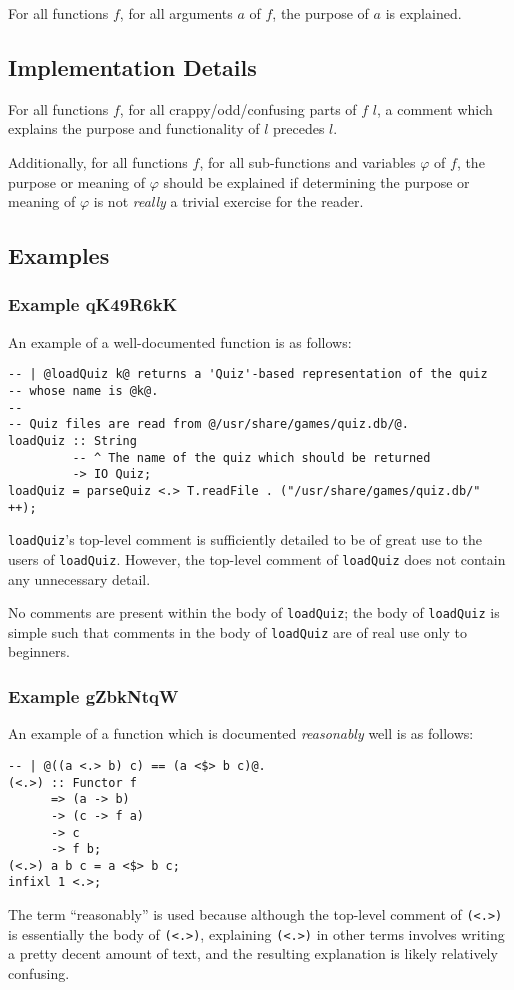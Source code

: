 \documentclass{report}
\begin{document}
For all functions $f$, for all arguments $a$ of $f$, the purpose of $a$ is explained.
\subsection{Implementation Details}
For all functions $f$, for all crappy/odd/confusing parts of $f$ $l$, a comment which explains the purpose and functionality of $l$ precedes $l$.

Additionally, for all functions $f$, for all sub-functions and variables $\varphi$ of $f$, the purpose or meaning of $\varphi$ should be explained if determining the purpose or meaning of $\varphi$ is not \textit{really} a trivial exercise for the reader.
\subsection{Examples}
\subsubsection{Example qK49R6kK}
An example of a well-documented function is as follows:
\lstset{style=customhaskell}
\begin{lstlisting}
-- | @loadQuiz k@ returns a 'Quiz'-based representation of the quiz
-- whose name is @k@.
--
-- Quiz files are read from @/usr/share/games/quiz.db/@.
loadQuiz :: String
         -- ^ The name of the quiz which should be returned
         -> IO Quiz;
loadQuiz = parseQuiz <.> T.readFile . ("/usr/share/games/quiz.db/" ++);
\end{lstlisting}
\texttt{loadQuiz}'s top-level comment is sufficiently detailed to be of great use to the users of \texttt{loadQuiz}.  However, the top-level comment of \texttt{loadQuiz} does not contain any unnecessary detail.

No comments are present within the body of \texttt{loadQuiz}; the body of \texttt{loadQuiz} is simple such that comments in the body of \texttt{loadQuiz} are of real use only to beginners.
\subsubsection{Example gZbkNtqW}
An example of a function which is documented \textit{reasonably} well is as follows:
\begin{lstlisting}
-- | @((a <.> b) c) == (a <$> b c)@.
(<.>) :: Functor f
      => (a -> b)
      -> (c -> f a)
      -> c
      -> f b;
(<.>) a b c = a <$> b c;
infixl 1 <.>;
\end{lstlisting}
The term ``reasonably'' is used because although the top-level comment of \texttt{(<.>)} is essentially the body of \texttt{(<.>)}, explaining \texttt{(<.>)} in other terms involves writing a pretty decent amount of text, and the resulting explanation is likely relatively confusing.
\end{document}
